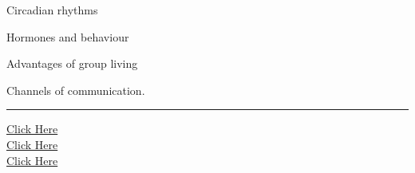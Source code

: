 \documentclass[11pt,a4paper]{article}
\begin{document}
\begin{parts}
  \item Circadian rhythms
  \item Hormones and behaviour
  \item Advantages of group living
  \item Channels of communication.
\end{parts}

\vfill
\rule{\linewidth}{0.4pt}

\begin{center}\small
\href{https://bhu-exam.vercel.app/}{Click Here}\\[4pt]\href{https://me-aryan.vercel.app/}{Click Here}\\[4pt]\href{https://quashan-me.vercel.app/}{Click Here}
\end{center}
\end{document}
